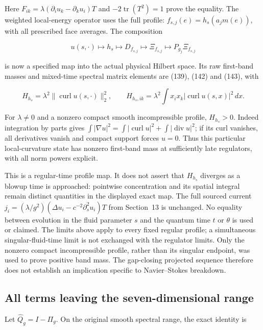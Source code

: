 Here \(F_{ik}=\lambda(\partial_iu_k-\partial_ku_i)T\) and
\(-2\operatorname{tr}(T^2)=1\) prove the equality. The weighted
local-energy operator uses the full profile:
\(f_{s,j}(e)=h_s(a_jm(e))\), with all prescribed face averages. The
composition

\[
u(s,\cdot)\longmapsto h_s\longmapsto D_{f_{s,j}}
 \longmapsto\Xi_{f_{s,j}}\longmapsto P_{g_j}\Xi_{f_{s,j}}
\]

is now a specified map into the actual physical Hilbert space. Its raw
first-band masses and mixed-time spectral matrix elements are (139),
(142) and (143), with

\[
H_{h_s}=\lambda^2\|\operatorname{curl}u(s,\cdot)\|_2^2,
 \qquad
 H_{h_s,ik}=\lambda^2\int x_ix_k|\operatorname{curl}u(s,x)|^2\,dx.
\]

For \(\lambda\ne0\) and a nonzero compact smooth incompressible profile,
\(H_{h_s}>0\). Indeed integration by parts gives
\(\int|\nabla u|^2=\int|\operatorname{curl}u|^2+
\int|\operatorname{div}u|^2\); if its curl vanishes, all derivatives
vanish and compact support forces \(u=0\). Thus this particular
local-curvature state has nonzero first-band mass at sufficiently late
regulators, with all norm powers explicit.

This is a regular-time profile map. It does not assert that \(H_{h_s}\)
diverges as a blowup time is approached: pointwise concentration and its
spatial integral remain distinct quantities in the displayed exact map.
The full sourced current
\(j_i=(\lambda/g^2)(\Delta u_i-c^{-2}\partial_s^2u_i)T\) from Section~13
is unchanged. No equality between evolution in the fluid parameter \(s\)
and the quantum time \(t\) or \(\theta\) is used or claimed. The limits
above apply to every fixed regular profile; a simultaneous
singular-fluid-time limit is not exchanged with the regulator limits.
Only the nonzero compact incompressible profile, rather than its
singular endpoint, was used to prove positive band mass. The gap-closing
projected sequence therefore does not establish an implication specific
to Navier--Stokes breakdown.

\subsection{All terms leaving the seven-dimensional
range}\label{local-energy-band-transfer-md-all-terms-leaving-the-seven-dimensional-range}

Let \(\widehat Q_g=I-\Pi_g\). On the original smooth spectral range, the
exact identity is

